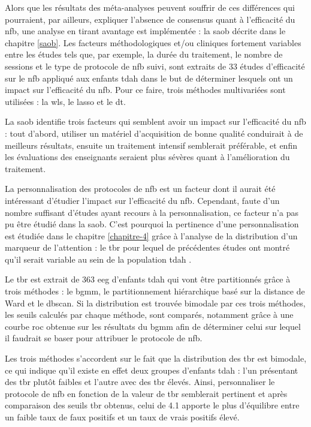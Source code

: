 Alors que les résultats des méta-analyses peuvent souffrir de ces différences qui pourraient, par ailleurs, expliquer l'absence de consensus quant 
à l'efficacité du \gls{nfb}, une analyse en tirant avantage est implémentée : la \gls{saob} décrite dans le chapitre \ref{saob}. Les facteurs méthodologiques et/ou 
cliniques fortement variables entre les études tels que, par exemple, la durée du traitement, le nombre de sessions et le type de protocole de \gls{nfb} 
suivi, sont extraits de 33 études d'efficacité sur le \gls{nfb} appliqué aux enfants \gls{tdah} dans le but de déterminer lesquels ont un impact sur 
l'efficacité du \gls{nfb}. Pour ce faire, trois méthodes multivariées sont utilisées : la \gls{wls}, le \gls{lasso} et le \gls{dt}. 

La \gls{saob} identifie trois facteurs qui semblent avoir un impact sur l'efficacité du \gls{nfb} : tout d'abord, utiliser un matériel d'acquisition de bonne 
qualité conduirait à de meilleurs résultats, ensuite un traitement intensif semblerait préférable, et enfin les évaluations des enseignants seraient plus
sévères quant à l'amélioration du traitement. 

La personnalisation des protocoles de \gls{nfb} est un facteur dont il aurait été intéressant d'étudier l'impact sur l'efficacité du \gls{nfb}.  
Cependant, faute d'un nombre suffisant d'études ayant recours à la personnalisation, ce facteur n'a pas pu être étudié dans la \gls{saob}. C'est pourquoi
la pertinence d'une personnalisation est étudiée dans le chapitre \ref{chapitre-4} grâce à l'analyse de la distribution d'un marqueur de l'attention : le \gls{tbr} pour
lequel de précédentes études ont montré qu'il serait variable au sein de la population \gls{tdah} \citep{Zhang2017, Arns2013, Clarke2001}.

Le \gls{tbr} est extrait de 363 \gls{eeg} d'enfants \gls{tdah} qui vont être partitionnés grâce à trois méthodes : le \gls{bgmm}, le partitionnement
hiérarchique basé sur la distance de Ward et le \gls{dbscan}. Si la distribution est trouvée bimodale par ces trois méthodes, les seuils calculés par chaque méthode,
sont comparés, notamment grâce à une courbe \gls{roc} obtenue sur
les résultats du \gls{bgmm} afin de déterminer celui sur lequel il faudrait se baser pour attribuer le protocole de \gls{nfb}.

Les trois méthodes s'accordent sur le fait que la distribution des \gls{tbr} est bimodale, ce qui indique qu'il existe en effet deux groupes d'enfants
\gls{tdah} : l'un présentant des \gls{tbr} plutôt faibles et l'autre avec des \gls{tbr} élevés. Ainsi, personnaliser le protocole de \gls{nfb} en 
fonction de la valeur de \gls{tbr} semblerait pertinent et après comparaison des seuils \gls{tbr} obtenus, celui de 4.1 apporte le plus d'équilibre entre 
un faible taux de faux positifs et un taux de vrais positifs élevé.  

